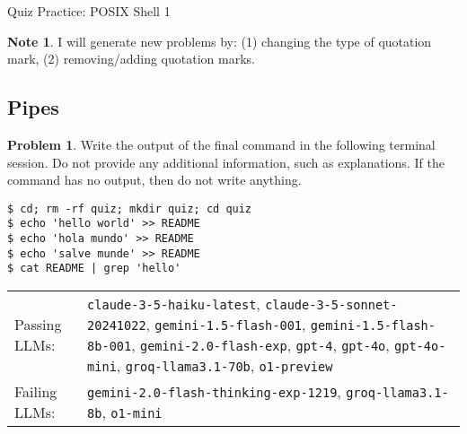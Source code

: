 \documentclass[10pt]{article}
\theoremstyle{definition}
\newtheorem{problem}{Problem}
\newtheorem{note}{Note}
\begin{document}
\begin{center}
{
\Large
Quiz Practice: POSIX Shell 1
}
\vspace{0.1in}
\end{center}

\begin{note}
    I will generate new problems by:
    (1) changing the type of quotation mark,
    (2) removing/adding quotation marks.
\end{note}

\begin{samepage}
\section{Pipes}

\begin{problem}
Write the output of the final command in the following terminal session.
Do not provide any additional information,
such as explanations.
If the command has no output,
then do not write anything.

\end{problem}
\begin{lstlisting}
$ cd; rm -rf quiz; mkdir quiz; cd quiz
$ echo 'hello world' >> README
$ echo 'hola mundo' >> README
$ echo 'salve munde' >> README
$ cat README | grep 'hello'
\end{lstlisting}


\noindent
\begin{tabular}{p{1.0in}L{5in}}
Passing LLMs: & {\lstinline$claude-3-5-haiku-latest$}, {\lstinline$claude-3-5-sonnet-20241022$}, {\lstinline$gemini-1.5-flash-001$}, {\lstinline$gemini-1.5-flash-8b-001$}, {\lstinline$gemini-2.0-flash-exp$}, {\lstinline$gpt-4$}, {\lstinline$gpt-4o$}, {\lstinline$gpt-4o-mini$}, {\lstinline$groq-llama3.1-70b$}, {\lstinline$o1-preview$} \\
Failing LLMs: & {\lstinline$gemini-2.0-flash-thinking-exp-1219$}, {\lstinline$groq-llama3.1-8b$}, {\lstinline$o1-mini$} \\
\end{tabular}

\end{samepage}
\end{document}
